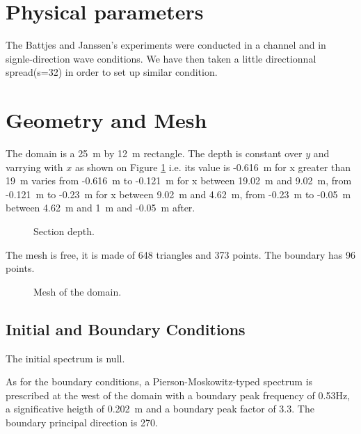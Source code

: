 %
%

%
%
\section{Physical parameters}
%
The Battjes and Janssen's experiments were conducted in a channel and in
signle-direction wave conditions. We have then taken a little directionnal
spread(s=32) in order to set up similar condition.

%
%
\section{Geometry and Mesh}
%
The domain is a 25~m by 12~m rectangle. The depth is constant over $y$ and
varrying with $x$ as shown on Figure \ref{bathybj} i.e. its value is -0.616~m
for x greater than 19~m varies from -0.616~m to -0.121~m for x between 19.02~m
and 9.02~m, from -0.121~m to -0.23~m for x between 9.02~m and 4.62~m, from
-0.23~m to -0.05~m between 4.62~m and 1~m and -0.05~m after.    

\begin{figure} [!h]
\centering
{}
 \caption{Section depth.}
\label{bathybj}
\end{figure}

The mesh is free, it is made of 648 triangles and 373 points. The boundary has
96 points.

\begin{figure} [!h]
\centering
{}
\caption{Mesh of the domain.}
\label{meshbj}
\end{figure}
\subsection{Initial and Boundary Conditions}
The initial spectrum is null.

As for the boundary conditions, a Pierson-Moskowitz-typed spectrum is
prescribed at the west of the domain with a boundary peak frequency of 0.53Hz, a
significative heigth of 0.202~m and a boundary peak factor of 3.3. The boundary
principal direction is 270.
%
%
